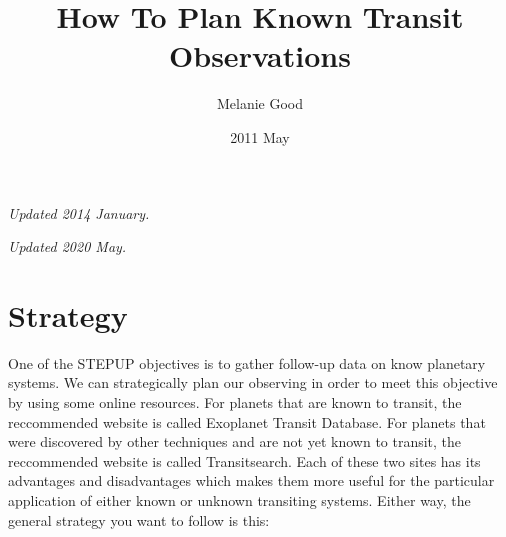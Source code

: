 \documentclass[12pt, preprint]{article}
\begin{document}
\title{How To Plan Known Transit Observations}
\author{Melanie Good}
\date{2011 May}
\maketitle

\emph{Updated 2014 January.}


\emph{Updated 2020 May.}

\section{Strategy}

One of the STEPUP objectives is to gather follow-up data on know planetary systems. We can strategically plan our observing in order to meet this objective by using some online resources. For planets that are known to transit, the reccommended website is called Exoplanet Transit Database.  For planets that were discovered by other techniques and are not yet known to transit, the reccommended website is called Transitsearch.  Each of these two sites has its advantages and disadvantages which makes them more useful for the particular application of either known or unknown transiting systems.  Either way, the general strategy you want to follow is this:
\end{document}
